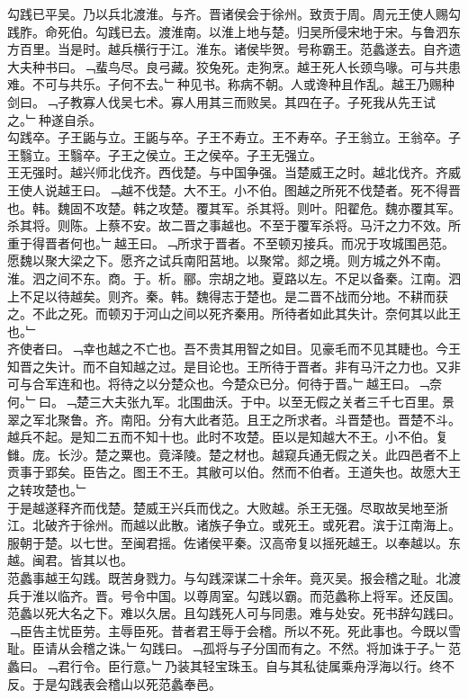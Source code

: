 \documentclass{zhvt-classic}
\begin{document}
\hspace*{2em}勾践已平吴。乃以兵北渡淮。与齐。晋诸侯会于徐州。致贡于周。周元王使人赐勾践胙。命死伯。勾践已去。渡淮南。以淮上地与楚。归吴所侵宋地于宋。与鲁泗东方百里。当是时。越兵横行于江。淮东。诸侯毕贺。号称霸王。范蠡遂去。自齐遗大夫种书曰。﹁蜚鸟尽。良弓藏。狡兔死。走狗烹。越王死人长颈鸟喙。可与共患难。不可与共乐。子何不去。﹂种见书。称病不朝。人或谗种且作乱。越王乃赐种剑曰。﹁子教寡人伐吴七术。寡人用其三而败吴。其四在子。子死我从先王试之。﹂种遂自杀。\\
\hspace*{2em}勾践卒。子王鼫与立。王鼫与卒。子王不寿立。王不寿卒。子王翁立。王翁卒。子王翳立。王翳卒。子王之侯立。王之侯卒。子王无强立。\\
\hspace*{2em}王无强时。越兴师北伐齐。西伐楚。与中国争强。当楚威王之时。越北伐齐。齐威王使人说越王曰。﹁越不伐楚。大不王。小不伯。图越之所死不伐楚者。死不得晋也。韩。魏固不攻楚。韩之攻楚。覆其军。杀其将。则叶。阳翟危。魏亦覆其军。杀其将。则陈。上蔡不安。故二晋之事越也。不至于覆军杀将。马汗之力不效。所重于得晋者何也。﹂越王曰。﹁所求于晋者。不至顿刃接兵。而况于攻城围邑范。愿魏以聚大梁之下。愿齐之试兵南阳莒地。以聚常。郯之境。则方城之外不南。淮。泗之间不东。商。于。析。郦。宗胡之地。夏路以左。不足以备秦。江南。泗上不足以待越矣。则齐。秦。韩。魏得志于楚也。是二晋不战而分地。不耕而获之。不此之死。而顿刃于河山之间以死齐秦用。所待者如此其失计。奈何其以此王也。﹂\\
\hspace*{2em}齐使者曰。﹁幸也越之不亡也。吾不贵其用智之如目。见豪毛而不见其睫也。今王知晋之失计。而不自知越之过。是目论也。王所待于晋者。非有马汗之力也。又非可与合军连和也。将待之以分楚众也。今楚众已分。何待于晋。﹂越王曰。﹁奈何。﹂曰。﹁楚三大夫张九军。北围曲沃。于中。以至无假之关者三千七百里。景翠之军北聚鲁。齐。南阳。分有大此者范。且王之所求者。斗晋楚也。晋楚不斗。越兵不起。是知二五而不知十也。此时不攻楚。臣以是知越大不王。小不伯。复雠。庞。长沙。楚之粟也。竟泽陵。楚之材也。越窥兵通无假之关。此四邑者不上贡事于郢矣。臣告之。图王不王。其敝可以伯。然而不伯者。王道失也。故愿大王之转攻楚也。﹂\\
\hspace*{2em}于是越遂释齐而伐楚。楚威王兴兵而伐之。大败越。杀王无强。尽取故吴地至浙江。北破齐于徐州。而越以此散。诸族子争立。或死王。或死君。滨于江南海上。服朝于楚。以七世。至闽君摇。佐诸侯平秦。汉高帝复以摇死越王。以奉越以。东越。闽君。皆其以也。\\
\hspace*{2em}范蠡事越王勾践。既苦身戮力。与勾践深谋二十余年。竟灭吴。报会稽之耻。北渡兵于淮以临齐。晋。号令中国。以尊周室。勾践以霸。而范蠡称上将军。还反国。范蠡以死大名之下。难以久居。且勾践死人可与同患。难与处安。死书辞勾践曰。﹁臣告主忧臣劳。主辱臣死。昔者君王辱于会稽。所以不死。死此事也。今既以雪耻。臣请从会稽之诛。﹂勾践曰。﹁孤将与子分国而有之。不然。将加诛于子。﹂范蠡曰。﹁君行令。臣行意。﹂乃装其轻宝珠玉。自与其私徒属乘舟浮海以行。终不反。于是勾践表会稽山以死范蠡奉邑。\\
\end{document}
